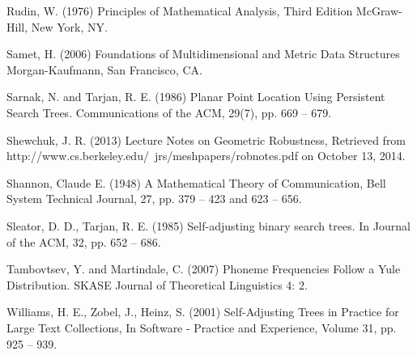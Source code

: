 \documentclass[mcs]{scsthesis}
\begin{document}
\begin{thebibliography}{5}
Rudin, W. (1976) Principles of Mathematical Analysis, Third Edition
McGraw-Hill, New York, NY.

Samet, H. (2006) Foundations of Multidimensional and Metric Data Structures
Morgan-Kaufmann, San Francisco, CA.

Sarnak, N. and Tarjan, R. E. (1986) Planar Point Location Using Persistent
Search Trees. Communications of the ACM, 29(7), pp. 669 -- 679.

 Shewchuk, J. R. (2013) Lecture Notes on Geometric Robustness,
Retrieved from http://www.cs.berkeley.edu/~jrs/meshpapers/robnotes.pdf on
October 13, 2014.

Shannon, Claude E. (1948) A Mathematical Theory of Communication,
Bell System Technical Journal, 27, pp. 379 -- 423 and 623 -- 656.

Sleator, D. D., Tarjan, R. E. (1985) Self-adjusting binary search trees.
In Journal of the ACM, 32, pp. 652 -- 686.

Tambovtsev, Y. and Martindale, C. (2007) Phoneme Frequencies Follow a Yule
Distribution. SKASE Journal of Theoretical Linguistics 4: 2.

Williams, H. E., Zobel, J., Heinz, S. (2001) Self-Adjusting Trees in Practice
for Large Text Collections, In Software - Practice and Experience,
Volume 31, pp. 925 -- 939.

\end{thebibliography}
\end{document}
